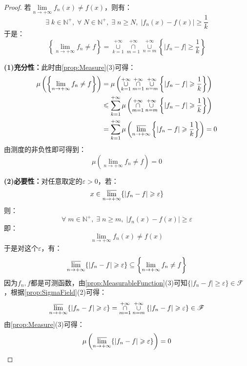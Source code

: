 \begin{proof}
	若$\lim\limits_{n\to+\infty}f_n(x)\ne f(x)$，则有：
	\begin{equation*}
		\exists\;k\in\mathbb{N}^+,\;\forall\;N\in\mathbb{N}^+,\;\exists\;n\geqslant N,\;|f_n(x)-f(x)|\geqslant\frac{1}{k}
	\end{equation*}
	于是：
	\begin{equation*}
		\left\{\lim_{n\to+\infty}f_n\ne f\right\}=\underset{k=1}{\overset{+\infty}{\cup}}\underset{m=1}{\overset{+\infty}{\cap}}\underset{n=m}{\overset{+\infty}{\cup}}\left\{|f_n-f|\geqslant\frac{1}{k}\right\}
	\end{equation*}\par
	\textbf{(1)充分性：}此时由\cref{prop:Measure}(3)可得：
	\begin{align*}
		\mu\left(\left\{\lim_{n\to+\infty}f_n\ne f\right\}\right)
		&=\mu\left(\underset{k=1}{\overset{+\infty}{\cup}}\underset{m=1}{\overset{+\infty}{\cap}}\underset{n=m}{\overset{+\infty}{\cup}}\left\{|f_n-f|\geqslant\frac{1}{k}\right\}\right) \\
		&\leqslant\sum_{k=1}^{+\infty}\mu\left(\underset{m=1}{\overset{+\infty}{\cap}}\underset{n=m}{\overset{+\infty}{\cup}}\left\{|f_n-f|\geqslant\frac{1}{k}\right\}\right) \\
		&=\sum_{k=1}^{+\infty}\mu\left(\varlimsup_{n\to+\infty}\left\{|f_n-f|\geqslant\frac{1}{k}\right\}\right)=0
	\end{align*}
	由测度的非负性即可得到：
	\begin{equation*}
		\mu\left(\lim_{n\to+\infty}f_n\ne f\right)=0
	\end{equation*}\par
	\textbf{(2)必要性：}对任意取定的$\varepsilon>0$，若：
	\begin{equation*}
		x\in\varlimsup_{n\to+\infty}\{|f_n-f|\geqslant\varepsilon\}
	\end{equation*}
	则：
	\begin{equation*}
		\forall\;m\in\mathbb{N}^+,\;\exists\;n\geqslant m,\;|f_n(x)-f(x)|\geqslant \varepsilon
	\end{equation*}
	即：
	\begin{equation*}
		\lim_{n\to+\infty}f_n(x)\ne f(x)
	\end{equation*}
	于是对这个$\varepsilon$，有：
	\begin{equation*}
		\varlimsup_{n\to+\infty}\{|f_n-f|\geqslant\varepsilon\}\subseteq\left\{\lim_{n\to+\infty}f_n\ne f\right\}
	\end{equation*}
	因为$f_n,f$都是可测函数，由\cref{prop:MeasurableFunction}(3)可知$\{|f_n-f|\geqslant\varepsilon\}\in\mathscr{F}$，根据\cref{prop:SigmaField}(2)可得：
	\begin{equation*}
		\varlimsup_{n\to+\infty}\{|f_n-f|\geqslant\varepsilon\}=\underset{m=1}{\overset{+\infty}{\cap}}\underset{n=m}{\overset{+\infty}{\cup}}\{|f_n-f|\geqslant\varepsilon\}\in \mathscr{F}
	\end{equation*}
	由\cref{prop:Measure}(3)可得：
	\begin{equation*}
		\mu\left(\varlimsup_{n\to+\infty}\{|f_n-f|\geqslant\varepsilon\}\right)=0\qedhere
	\end{equation*}
\end{proof}
